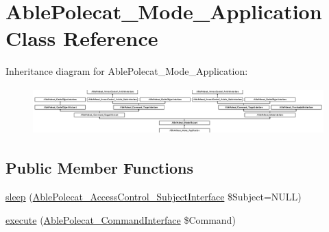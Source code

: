 \hypertarget{class_able_polecat___mode___application}{}\section{Able\+Polecat\+\_\+\+Mode\+\_\+\+Application Class Reference}
\label{class_able_polecat___mode___application}
Inheritance diagram for Able\+Polecat\+\_\+\+Mode\+\_\+\+Application\+:\begin{figure}[H]
\begin{center}
\leavevmode
\includegraphics[height=1.806452cm]{class_able_polecat___mode___application}
\end{center}
\end{figure}
\subsection*{Public Member Functions}
\begin{DoxyCompactItemize}
\item 
\hyperlink{class_able_polecat___mode___application_a365e24d7b066205cafa2a5cce3a4f224}{sleep} (\hyperlink{interface_able_polecat___access_control___subject_interface}{Able\+Polecat\+\_\+\+Access\+Control\+\_\+\+Subject\+Interface} \$Subject=N\+U\+L\+L)
\item 
\hyperlink{class_able_polecat___mode___application_aa7f01cbd17bffdbbb7511a3c37756064}{execute} (\hyperlink{interface_able_polecat___command_interface}{Able\+Polecat\+\_\+\+Command\+Interface} \$Command)
\end{DoxyCompactItemize}
